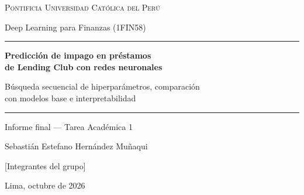 \documentclass[12pt,a4paper]{article}
\begin{document}
\begin{titlepage}
\thispagestyle{empty}
\centering
{\large\scshape Pontificia Universidad Católica del Perú\par}
\vspace{0.3cm}
{\normalsize Deep Learning para Finanzas (1FIN58)\par}
\vspace{3.2cm}
\rule{\linewidth}{0.8pt}\par\vspace{0.5cm}
{\LARGE\bfseries Predicción de impago en préstamos\\[0.2cm] de Lending Club con redes neuronales\par}
\vspace{0.5cm}
{\large Búsqueda secuencial de hiperparámetros, comparación\\ con modelos base e interpretabilidad\par}
\vspace{0.4cm}\rule{\linewidth}{0.8pt}\par
\vspace{1.2cm}
{\large Informe final — Tarea Académica 1\par}
\vfill
{\large Sebastián Estefano Hernández Muñaqui\par}
\vspace{0.3cm}
{\normalsize [Integrantes del grupo]\par}
\vspace{1.2cm}
{\normalsize Lima, octubre de 2026\par}
\end{titlepage}

\end{document}
